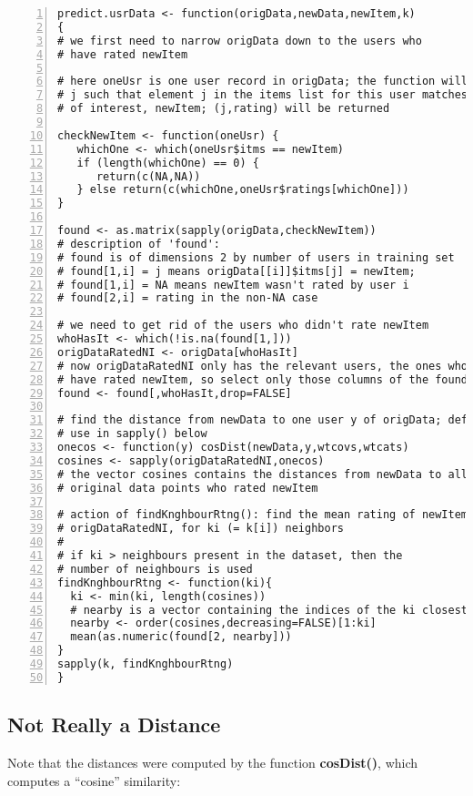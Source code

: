 \begin{lstlisting}[numbers=left]
predict.usrData <- function(origData,newData,newItem,k)
{
# we first need to narrow origData down to the users who 
# have rated newItem

# here oneUsr is one user record in origData; the function will look for a 
# j such that element j in the items list for this user matches the item 
# of interest, newItem; (j,rating) will be returned

checkNewItem <- function(oneUsr) {
   whichOne <- which(oneUsr$itms == newItem)
   if (length(whichOne) == 0) {
      return(c(NA,NA))
   } else return(c(whichOne,oneUsr$ratings[whichOne]))
}

found <- as.matrix(sapply(origData,checkNewItem))
# description of 'found':
# found is of dimensions 2 by number of users in training set
# found[1,i] = j means origData[[i]]$itms[j] = newItem;
# found[1,i] = NA means newItem wasn't rated by user i
# found[2,i] = rating in the non-NA case

# we need to get rid of the users who didn't rate newItem
whoHasIt <- which(!is.na(found[1,]))
origDataRatedNI <- origData[whoHasIt]
# now origDataRatedNI only has the relevant users, the ones who 
# have rated newItem, so select only those columns of the found matrix
found <- found[,whoHasIt,drop=FALSE]

# find the distance from newData to one user y of origData; defined for
# use in sapply() below
onecos <- function(y) cosDist(newData,y,wtcovs,wtcats)
cosines <- sapply(origDataRatedNI,onecos)
# the vector cosines contains the distances from newData to all the
# original data points who rated newItem

# action of findKnghbourRtng(): find the mean rating of newItem in
# origDataRatedNI, for ki (= k[i]) neighbors
#
# if ki > neighbours present in the dataset, then the 
# number of neighbours is used
findKnghbourRtng <- function(ki){
  ki <- min(ki, length(cosines))
  # nearby is a vector containing the indices of the ki closest neighbours
  nearby <- order(cosines,decreasing=FALSE)[1:ki]
  mean(as.numeric(found[2, nearby]))
}
sapply(k, findKnghbourRtng)
}
\end{lstlisting}

\subsection{Not Really a Distance}

Note that the distances were computed by the function
\textbf{cosDist()}, which computes a ``cosine'' similarity:

